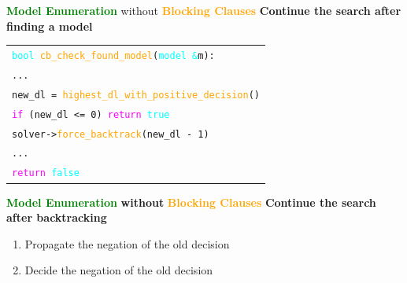 \documentclass{beamer}
\begin{document}
\begin{frame}{\textcolor{green}{\textbf{Model Enumeration}} without \textcolor{orange}{\textbf{Blocking Clauses}}}
  \textbf{Continue the search after finding a model}
  \begin{beamerbox}[Beispielbox]
    \begin{tabular}{l}
    \texttt{\textcolor{cyan}{bool} \textcolor{orange}{cb\_check\_found\_model}(\textcolor{cyan}{model \&}m): } \\
    \texttt{\quad ...} \\
    \texttt{\quad new\_dl = \textcolor{orange}{highest\_dl\_with\_positive\_decision}()} \\
    \texttt{\quad \textcolor{magenta}{if} (new\_dl <= 0) \textcolor{magenta}{return} \textcolor{cyan}{true}} \\
    \texttt{\quad solver->\textcolor{orange}{force\_backtrack}(new\_dl - 1)} \\
    \texttt{\quad ...} \\
    \texttt{\quad \textcolor{magenta}{return} \textcolor{cyan}{false}}
    \end{tabular}
  \end{beamerbox}
\end{frame}

\begin{frame}{\textcolor{green}{\textbf{Model Enumeration}} \textbf{without} \textcolor{orange}{\textbf{Blocking Clauses}}}
  \textbf{Continue the search after backtracking}
  \begin{enumerate}
    \item Propagate the negation of the old decision
    \item Decide the negation of the old decision
  \end{enumerate}
\end{frame}
\end{document}
